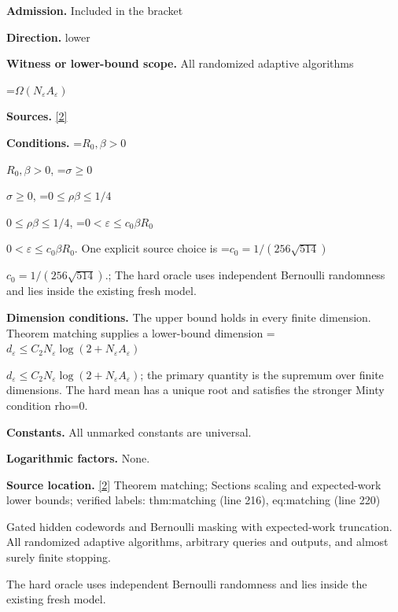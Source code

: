 \documentclass[10pt,a4paper]{article}
\newcommand{\AtlasMath}[1]{\par\begingroup\centering\setbox0=\hbox{$\displaystyle #1$}\ifdim\wd0>1.4\linewidth\typeout{ATLAS WIDE FORMULA: \the\wd0}\fi\ifdim\wd0>\linewidth\resizebox{\linewidth}{!}{\box0}\else\box0\fi\par\endgroup}
\newcommand{\AtlasInlineMath}[1]{\begingroup\setbox0=\hbox{$#1$}\ifdim\wd0>.4\linewidth\endgroup\AtlasMath{#1}\else\endgroup$#1$\fi}
\begin{document}
\textbf{Admission.} Included in the bracket



\textbf{Direction.} lower



\textbf{Witness or lower-bound scope.} All randomized adaptive algorithms



\AtlasMath{\Omega(N_\varepsilon A_\varepsilon)}


\textbf{Sources.} \href{https://github.com/WU-Wendao/Colombo/blob/main/colombo_sensorium/Complexity_altas/data/sources/colombo/N03/manuscript.pdf}{[2]}



\textbf{Conditions.} \AtlasInlineMath{R_0,\beta>0}, \AtlasInlineMath{\sigma\ge0}, \AtlasInlineMath{0\le\rho\beta\le1/4}, \AtlasInlineMath{0<\varepsilon\le c_0\beta R_0}. One explicit source choice is \AtlasInlineMath{c_0=1/(256\sqrt{514})}.; The hard oracle uses independent Bernoulli randomness and lies inside the existing fresh model.



\textbf{Dimension conditions.} The upper bound holds in every finite dimension. Theorem matching supplies a lower-bound dimension \AtlasInlineMath{d_\varepsilon\le C_2N_\varepsilon\log(2+N_\varepsilon A_\varepsilon)}; the primary quantity is the supremum over finite dimensions. The hard mean has a unique root and satisfies the stronger Minty condition rho=0.



\textbf{Constants.} All unmarked constants are universal.



\textbf{Logarithmic factors.} None.



\textbf{Source location.} \href{https://github.com/WU-Wendao/Colombo/blob/main/colombo_sensorium/Complexity_altas/data/sources/colombo/N03/manuscript.pdf}{[2]} Theorem matching; Sections scaling and expected-work lower bounds; verified labels: thm:matching (line 216), eq:matching (line 220)



Gated hidden codewords and Bernoulli masking with expected-work truncation. All randomized adaptive algorithms, arbitrary queries and outputs, and almost surely finite stopping.



The hard oracle uses independent Bernoulli randomness and lies inside the existing fresh model.
\end{document}
